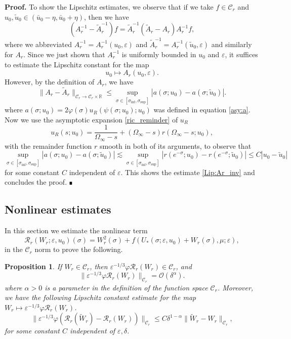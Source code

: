 \documentclass[letterpaper,11pt]{article}
\newcommand{\rmO}{\mathcal{O}}
\newcommand{\eps}{\varepsilon}
\newcommand{\lar}{ \lesssim }
\numberwithin{equation}{section}
\theoremstyle{plain}
\newtheorem{proposition}[theorem]{Proposition}
\newenvironment{Proof}[1][.]%
 {\begin{trivlist}\item[]\textbf{Proof#1 }}%
 {\hspace*{\fill}$\rule{0.3\baselineskip}{0.35\baselineskip}$\end{trivlist}}
\begin{document}
\begin{Proof}
To show the Lipschitz estimates, we observe that if we take $f \in \mathcal{C}_r$ and $u_0, \tilde{u}_0 \in (\bar{u}_0-\eta, \bar{u}_0+\eta)$, then we have
\[
(A_r^{-1} -\tilde{A}_r^{-1})f = \tilde{A}_r^{-1}(\tilde{A}_r-A_r)A_r^{-1}f,
\]
where we abbreviated $A_r^{-1} = A_r^{-1}(u_0,\eps)$ and $\tilde{A}_r^{-1} = A_r^{-1}(\tilde{u}_0,\eps)$ and similarly for $A_r$. Since we just shown that $A_r^{-1}$ is uniformly bounded in $u_0$ and $\eps$, it suffices to estimate the Lipschitz constant for the map
\[
u_0 \mapsto A_r(u_0,\eps).
\]
However, by the definition of $A_r$, we have
\[
\|A_r-\tilde{A}_r\|_{\mathcal{C}_r\to \mathcal{C}_r\times \mathbb{R}} \le  \sup_{\sigma \in [\sigma_{\inf},\sigma_{\sup}]} |a(\sigma;u_0) - a(\sigma;\tilde{u}_0)|.
\]
where $a(\sigma; u_0) =  2\varphi(\sigma)u_R(\psi(\sigma;u_0);u_0)$ was defined in equation \eqref{asy:a}. Now we use the asymptotic expansion \eqref{ric_reminder} of $u_R$
\[
u_R(s;u_0) = \frac{1}{\Omega_\infty-s} +  (\Omega_\infty-s) r(\Omega_\infty-s;u_0),
\]
with the remainder function $r$ smooth in both of its arguments, to observe that
\[
\sup_{\sigma \in [\sigma_{\inf},\sigma_{\sup}]} |a(\sigma;u_0) - a(\sigma;\tilde{u}_0)|\lar 
\sup_{\sigma \in [\sigma_{\inf},\sigma_{\sup}]} |r(e^{-\sigma};u_0)-r(e^{-\sigma};\tilde{u}_0)|\le C|u_0-\tilde{u}_0|
\] 
for some constant $C$ independent of $\eps$. This shows the estimate \eqref{Lip:Ar_inv} and concludes the proof.
\end{Proof}

\subsection{Nonlinear estimates}

In this section we estimate the nonlinear term
\[
\mathcal{R}_r(W_r;\eps,u_0)(\sigma) = W_r^2(\sigma) + f(U_*(\sigma;\eps,u_0)+W_r(\sigma), \mu ; \eps),
\]
in the $\mathcal{C}_r$ norm to prove the following.
\begin{proposition}\label{nl_est_r}
If $W_r \in \mathcal{C}_{r}$, then $\eps^{-1/3}\varphi \mathcal{R}_r(W_r) \in \mathcal{C}_{r}$, and
\begin{equation}\label{nl_est:Rr}
\|\eps^{-1/3}\varphi \mathcal{R}_r(W_r) \|_{\mathcal{C}_r} = \rmO(\delta^{\alpha}).
\end{equation}
where $\alpha>0$ is a parameter in the definition of the function space $\mathcal{C}_r$.
Moreover, we have the following Lipschitz constant estimate for the map $W_r \mapsto \eps^{-1/3}\varphi\mathcal{R}_r(W_r)$.
\begin{equation}\label{Lip_est:Rr}
\|\eps^{-1/3}\varphi(\mathcal{R}_r(\widetilde{W}_r) - \mathcal{R}_r(W_r)) \|_{\mathcal{C}_r}\le C\delta^{1-\alpha} \|\widetilde{W}_r - W_r \|_{\mathcal{C}_r},
\end{equation}
for some constant $C$ independent of $\eps, \delta$.
\end{proposition}
\end{document}
